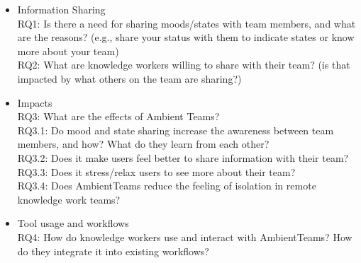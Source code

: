 \begin{itemize}
      \item Information Sharing\\
            RQ1: Is there a need for sharing moods/states with team members, and what are the reasons? (e.g., share your status with them to indicate states or know more about your team)\\
            RQ2: What are knowledge workers willing to share with their team? (is that impacted by what others on the team are sharing?)
      \item Impacts\\
            RQ3: What are the effects of Ambient Teams?\\
            RQ3.1: Do mood and state sharing increase the awareness between team members, and how? What do they learn from each other?\\
            RQ3.2: Does it make users feel better to share information with their team?\\
            RQ3.3: Does it stress/relax users to see more about their team?\\
            RQ3.4: Does AmbientTeams reduce the feeling of isolation in remote knowledge work teams?
      \item Tool usage and workflows\\
            RQ4: How do knowledge workers use and interact with AmbientTeams? How do they integrate it into existing workflows?
\end{itemize}

